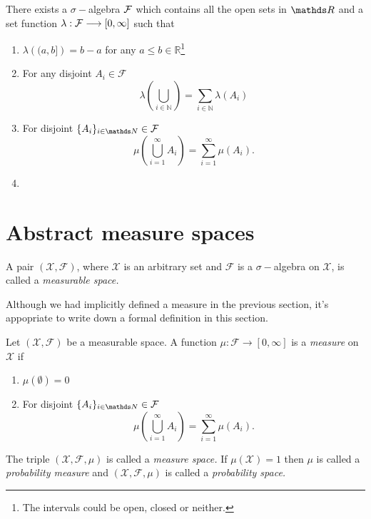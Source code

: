 \begin{thm}
\label{thm:existenceLebesgueR}There exists a $\sigma-$algebra $\mathcal{F}$
which contains all the open sets in $\R$ and a set function $\lambda:\mathcal{F}\longrightarrow\left[0,\infty\right]$
such that

\begin{enumerate}[label=(\roman*),leftmargin=.1\linewidth,rightmargin=.4\linewidth]
	\item $\lambda\left((a,b]\right) = b - a $ for any $a \leq b \in \mathds{R}$\footnote{The intervals could be open, closed or neither.}
	\item For any disjoint $A_i \in \mathcal{F}$
	\[
			\lambda\left(\bigcup_{i\in\mathds{N}}\right) = \sum_{i \in \mathds{N}} \lambda\left(A_i\right)
	\]
	\item For disjoint $\{A_i\}_{i\in \N} \in \mathcal{F}$ 
	\[
			\mu\left(\bigcup_{i=1}^{\infty}A_i\right) = \sum_{i=1}^{\infty}\mu\left(A_i\right).
	\]
	\item
\end{enumerate}
\end{thm}


\section{Abstract measure spaces}
\begin{defn}
\label{def:measurableSpace}A pair $\left(\mathcal{X},\mathcal{F}\right)$,
where $\mathcal{X}$ is an arbitrary set and $\mathcal{F}$ is a $\sigma-$algebra
on $\mathcal{X}$, is called a \emph{measurable space.}
\end{defn}

Although we had implicitly defined a measure in the previous section,
it's appopriate to write down a formal definition in this section.
\begin{defn}
\label{def:measureSpace}Let $\left(\mathcal{X},\mathcal{F}\right)$
be a measurable space. A function $\mu:\mathcal{F}\longrightarrow\left[0,\infty\right]$
is a \emph{measure }on $\mathcal{X}$ if

\begin{enumerate}[label=(\roman*),leftmargin=.1\linewidth,rightmargin=.4\linewidth]
	\item $\mu\left(\emptyset\right)= 0$
	\item For disjoint $\{A_i\}_{i\in \N} \in \mathcal{F}$ 
	\[
			\mu\left(\bigcup_{i=1}^{\infty}A_i\right) = \sum_{i=1}^{\infty}\mu\left(A_i\right).
	\]
\end{enumerate}The triple $\left(\mathcal{X},\mathcal{F},\mu\right)$ is called a
\emph{measure space. }If $\mu\left(\mathcal{X}\right)=1$ then $\mu$
is called a \emph{probability measure }and $\left(\mathcal{X},\mathcal{F},\mu\right)$
is called a \emph{probability space.}
\end{defn}

